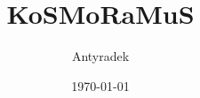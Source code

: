 \documentclass[a4paper]{report}
\newcommand\chapterdir{chapters}
\begin{document}
	\title{KoSMoRaMuS}
	\author{Antyradek}
	\date{\today}
	\maketitle
	\tableofcontents
	
\end{document}
